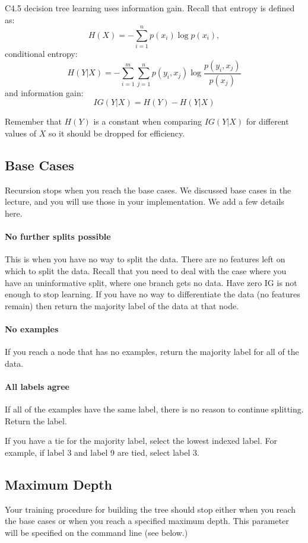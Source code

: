 \documentclass[11pt]{article}
\begin{document}
C4.5 decision tree learning uses information gain. Recall that entropy is defined as:
\[
H(X) = -\sum_{i=1}^n p(x_i) \log p(x_i),
\]
conditional entropy:
\[
H(Y|X) =  - \sum_{i = 1}^m \sum_{j=1}^n p(y_i,x_j) \log \frac{p(y_i,x_j)}{p(x_j)}
\]
and information gain:
\[
IG(Y|X) = H(Y) - H(Y|X)
\]

Remember that $H(Y)$ is a constant when comparing $IG(Y|X)$ for different values of $X$ so it should be dropped for efficiency.

\subsection{Base Cases}
Recursion stops when you reach the base cases. We discussed base cases in the lecture, and you will use those in your implementation. We add a few details here.

\paragraph{No further splits possible} This is when you have no way to split the data. There are no features left on which to split the data. Recall that you need to deal with the case where you have an uninformative split, where one branch gets no data. Have zero IG is not enough to stop learning. If you have no way to differentiate the data (no features remain) then return the majority label of the data at that node.

\paragraph{No examples} If you reach a node that has no examples, return the majority label for all of the data.

\paragraph{All labels agree} If all of the examples have the same label, there is no reason to continue splitting. Return the label.

If you have a tie for the majority label, select the lowest indexed label. For example, if label 3 and label 9 are tied, select label 3.

\subsection{Maximum Depth}
Your training procedure for building the tree should stop either when you reach the base cases or when you reach a specified maximum depth. This parameter will be specified on the command line (see below.)
\end{document}
